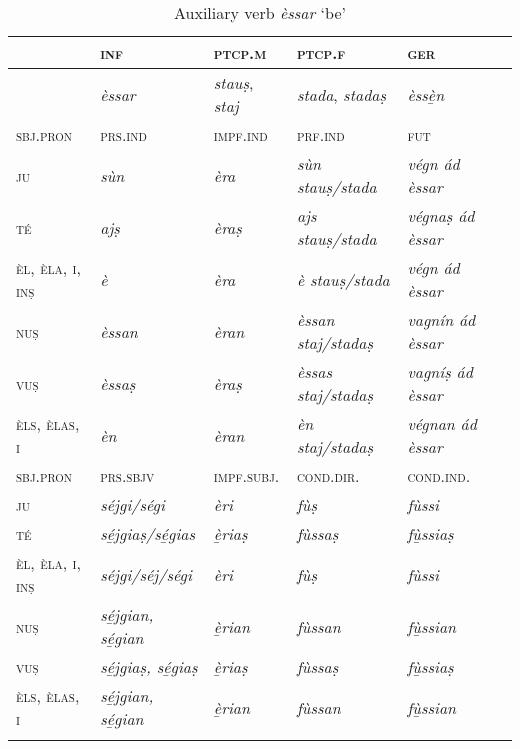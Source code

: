 \begin{table}
	\caption{Auxiliary verb \textit{èssar} `be'}
	\label{tab:aux:èssar}
	\begin{tabular}{llllll}
		\lsptoprule
		& \textsc{inf}  & \textsc{ptcp.m}  & \textsc{ptcp.f}  &  \textsc{ger}\\
		\midrule
		&\textit{èssar} &\textit{stauṣ}, \textit{staj}  & \textit{stada}, \textit{stadaṣ} & \textit{èssè̱n}\\
		\lsptoprule
	\textsc{sbj.pron} 	&\textsc{prs.ind}  &\textsc{impf.ind} & \textsc{prf.ind} & \textsc{fut}\\
		\midrule
		\textsc{ju} &\textit{sùn} & \textit{èra} &\textit{sùn stauṣ/stada} &\textit{végn ád èssar}\\
		\textsc{té} &\textit{ajṣ} &\textit{èraṣ} &\textit{ajs stauṣ/stada} & \textit{végnaṣ ád èssar}\\
		\textsc{èl, èla, i, inṣ} &\textit{è} & \textit{èra} & \textit{è stauṣ/stada} &\textit{végn ád èssar}\\
		\textsc{nuṣ} &\textit{èssan} &\textit{èran} & \textit{èssan staj/stadaṣ} &\textit{vagnín ád èssar}\\
		\textsc{vuṣ} &\textit{èssaṣ} & \textit{èraṣ} & \textit{èssas staj/stadaṣ} &\textit{vagníṣ ád èssar}\\
		\textsc{èls, èlas, i}& \textit{èn} & \textit{èran} & \textit{èn staj/stadaṣ} & \textit{végnan ád èssar}\\
		\lsptoprule
		\textsc{sbj.pron}    &\textsc{prs.sbjv} & \textsc{impf.subj.}  &\textsc{cond.dir.} & \textsc{cond.ind.}\\
		\midrule
		\textsc{ju} & \textit{séjgi/ségi} & \textit{èri} & \textit{fùṣ} & \textit{fùssi}\\
		\textsc{té} & \textit{sé̱jgiaṣ/sé̱gias} & \textit{è̱riaṣ} & \textit{fùssaṣ} & \textit{fù̱ssiaṣ}\\
		\textsc{èl, èla, i, inṣ} & \textit{séjgi/séj/ségi} & \textit{èri} & \textit{fùṣ} & \textit{fùssi}\\
		\textsc{nuṣ} & \textit{sé̱jgian, sé̱gian} & \textit{è̱rian} & \textit{fùssan} & \textit{fù̱ssian}\\
		\textsc{vuṣ} &  \textit{sé̱jgiaṣ, sé̱giaṣ} &  \textit{è̱riaṣ} & \textit{fùssaṣ} & \textit{fù̱ssiaṣ}\\
		\textsc{èls, èlas, i} & \textit{sé̱jgian, sé̱gian} & \textit{è̱rian} & \textit{fùssan} & \textit{fù̱ssian}\\
		\lspbottomrule
	\end{tabular}
\end{table}

